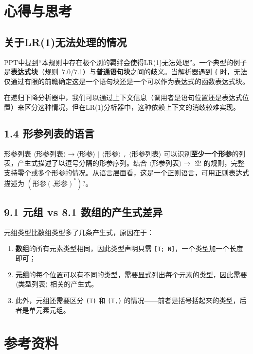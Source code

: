 \documentclass[12pt,a4paper]{ctexart}
\begin{document}
\section{心得与思考}

\subsection{关于LR(1)无法处理的情况}

PPT中提到“本规则中存在极个别的羁绊会使得LR(1)无法处理”。一个典型的例子是\textbf{表达式块}（规则~7.0/7.1）与\textbf{普通语句块}之间的歧义。当解析器遇到 \texttt{\{} 时，无法仅通过有限的前瞻确定这是一个语句块还是一个可以作为表达式的函数表达式块。

在递归下降分析器中，我们可以通过上下文信息（调用者是语句位置还是表达式位置）来区分这种情况，但在LR(1)分析器中，这种依赖上下文的消歧较难实现。

\subsection{1.4 形参列表的语言}

形参列表 $\langle$形参列表$\rangle \to \langle$形参$\rangle$ $|$ $\langle$形参$\rangle$ \texttt{,} $\langle$形参列表$\rangle$ 可以识别\textbf{至少一个形参}的列表，产生式描述了以逗号分隔的形参序列。结合 $\langle$形参列表$\rangle \to$ 空 的规则，完整支持零个或多个形参的情况。从语言层面看，这是一个正则语言，可用正则表达式描述为 $(\text{形参}(\texttt{,}\text{形参})^*)?$。

\subsection{9.1 元组 vs 8.1 数组的产生式差异}

元组类型比数组类型多了几条产生式，原因在于：
\begin{enumerate}
    \item \textbf{数组}的所有元素类型相同，因此类型声明只需 \texttt{[T; N]}，一个类型加一个长度即可；
    \item \textbf{元组}的每个位置可以有不同的类型，需要显式列出每个元素的类型，因此需要 $\langle$类型列表$\rangle$ 相关的产生式。
    \item 此外，元组还需要区分 \texttt{(T)} 和 \texttt{(T,)} 的情况——前者是括号括起来的类型，后者是单元素元组。
\end{enumerate}


\section{参考资料}
\end{document}
